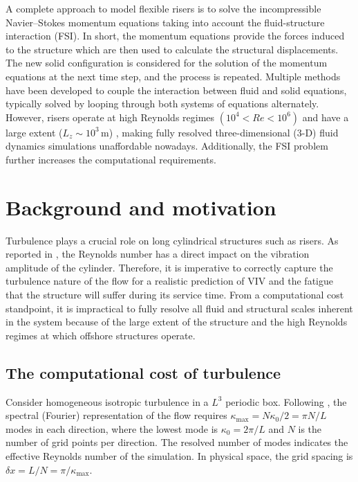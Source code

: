 \documentclass[../main.tex]{subfiles}
\begin{document}
A complete approach to model flexible risers is to solve the incompressible Navier--Stokes momentum equations taking into account the fluid-structure interaction (FSI).
In short, the momentum equations provide the forces induced to the structure which are then used to calculate the structural displacements.
The new solid configuration is considered for the solution of the momentum equations at the next time step, and the process is repeated.
Multiple methods have been developed to couple the interaction between fluid and solid equations, typically solved by looping through both systems of equations alternately.
However, risers operate at high Reynolds regimes $(10^4<Re<10^6)$ and have a large extent ($L_z \sim10^3\,\mathrm{m}$) \citep{Willden2001,Willden2004}, making fully resolved three-dimensional (3-D) fluid dynamics simulations unaffordable nowadays.
Additionally, the FSI problem further increases the computational requirements.

\section{Background and motivation}

Turbulence plays a crucial role on long cylindrical structures such as risers.
As reported in \cite{Evangelinos1999}, the Reynolds number has a direct impact on the vibration amplitude of the cylinder.
Therefore, it is imperative to correctly capture the turbulence nature of the flow for a realistic prediction of VIV and the fatigue that the structure will suffer during its service time.
From a computational cost standpoint, it is impractical to fully resolve all fluid and structural scales inherent in the system because of the large extent of the structure and the high Reynolds regimes at which offshore structures operate.

\subsection{The computational cost of turbulence}\label{sec:turbulence_cost}

Consider homogeneous isotropic turbulence in a $L^3$ periodic box.
Following \cite[p. 345]{Pope2000}, the spectral (Fourier) representation of the flow requires $\kappa_{\max}=N \kappa_0/2=\pi N/L$ modes in each direction, where the lowest mode is $\kappa_0=2\pi/L$ and $N$ is the number of grid points per direction.
The resolved number of modes indicates the effective Reynolds number of the simulation.
In physical space, the grid spacing is $\delta x=L/N=\pi/\kappa_{\max}$.
\end{document}
